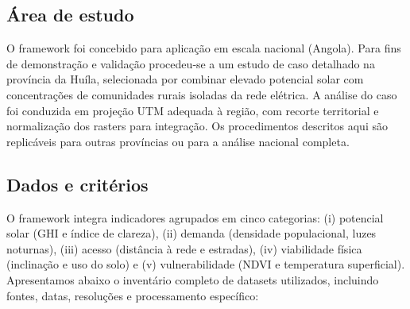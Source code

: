 \documentclass[12pt, a4paper]{article}
\begin{document}
\subsection{Área de estudo}

O framework foi concebido para aplicação em escala nacional (Angola). Para fins de demonstração e validação procedeu‑se a um estudo de caso detalhado na província da Huíla, selecionada por combinar elevado potencial solar com concentrações de comunidades rurais isoladas da rede elétrica. A análise do caso foi conduzida em projeção UTM adequada à região, com recorte territorial e normalização dos rasters para integração. Os procedimentos descritos aqui são replicáveis para outras províncias ou para a análise nacional completa.

\subsection{Dados e critérios}

O framework integra indicadores agrupados em cinco categorias: (i) potencial solar (GHI e índice de clareza), (ii) demanda (densidade populacional, luzes noturnas), (iii) acesso (distância à rede e estradas), (iv) viabilidade física (inclinação e uso do solo) e (v) vulnerabilidade (NDVI e temperatura superficial). Apresentamos abaixo o inventário completo de datasets utilizados, incluindo fontes, datas, resoluções e processamento específico:
\end{document}
